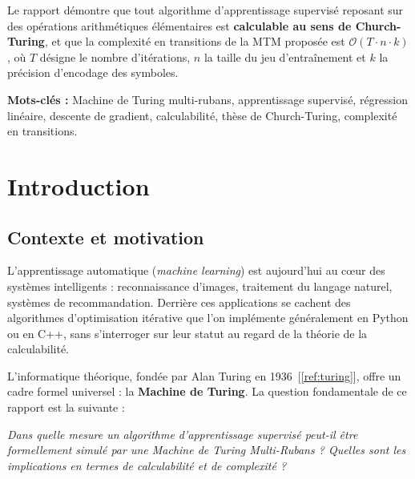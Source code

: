\documentclass[12pt, a4paper, oneside]{report}
\begin{document}
Le rapport démontre que tout algorithme d'apprentissage supervisé reposant sur des opérations arithmétiques élémentaires est \textbf{calculable au sens de Church-Turing}, et que la complexité en transitions de la MTM proposée est $\mathcal{O}(T \cdot n \cdot k)$, où $T$ désigne le nombre d'itérations, $n$ la taille du jeu d'entraînement et $k$ la précision d'encodage des symboles.

\vspace{0.5cm}
\noindent\textbf{Mots-clés :} Machine de Turing multi-rubans, apprentissage supervisé, régression linéaire, descente de gradient, calculabilité, thèse de Church-Turing, complexité en transitions.

\tableofcontents
{}

\listoffigures
{}

\listoftables
{}

\chapter{Introduction}

\section{Contexte et motivation}

L'apprentissage automatique (\textit{machine learning}) est aujourd'hui au cœur des systèmes intelligents : reconnaissance d'images, traitement du langage naturel, systèmes de recommandation. Derrière ces applications se cachent des algorithmes d'optimisation itérative que l'on implémente généralement en Python ou en C++, sans s'interroger sur leur statut au regard de la théorie de la calculabilité.

L'informatique théorique, fondée par Alan Turing en 1936~[\ref{ref:turing}], offre un cadre formel universel : la \textbf{Machine de Turing}. La question fondamentale de ce rapport est la suivante :

\begin{tcolorbox}[
  colback=lightgold, colframe=inptgold,
  fonttitle=\bfseries, title={Question de recherche},
  sharp corners, left=8pt, right=8pt
]
  \textit{Dans quelle mesure un algorithme d'apprentissage supervisé peut-il être formellement simulé par une Machine de Turing Multi-Rubans ? Quelles sont les implications en termes de calculabilité et de complexité ?}
\end{tcolorbox}
\end{document}
